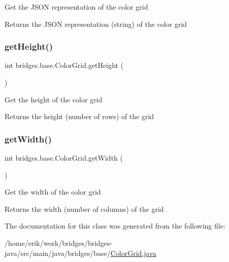 Get the J\+S\+ON representation of the color grid

\begin{DoxyReturn}{Returns}
the J\+S\+ON representation (string) of the color grid 
\end{DoxyReturn}
\mbox{\label{classbridges_1_1base_1_1_color_grid_a8793791e35f03b3e5a2e5ef3606ac124}} 
\subsubsection{\texorpdfstring{get\+Height()}{getHeight()}}
{\footnotesize\ttfamily int bridges.\+base.\+Color\+Grid.\+get\+Height (\begin{DoxyParamCaption}{ }\end{DoxyParamCaption})}

Get the height of the color grid

\begin{DoxyReturn}{Returns}
the height (number of rows) of the grid 
\end{DoxyReturn}
\mbox{\label{classbridges_1_1base_1_1_color_grid_af872226de86ac8e8f2553fdc5bddc375}} 
\subsubsection{\texorpdfstring{get\+Width()}{getWidth()}}
{\footnotesize\ttfamily int bridges.\+base.\+Color\+Grid.\+get\+Width (\begin{DoxyParamCaption}{ }\end{DoxyParamCaption})}

Get the width of the color grid

\begin{DoxyReturn}{Returns}
the width (number of columns) of the grid 
\end{DoxyReturn}


The documentation for this class was generated from the following file\+:\begin{DoxyCompactItemize}
\item 
/home/erik/work/bridges/bridges-\/java/src/main/java/bridges/base/\hyperlink{_color_grid_8java}{Color\+Grid.\+java}\end{DoxyCompactItemize}
